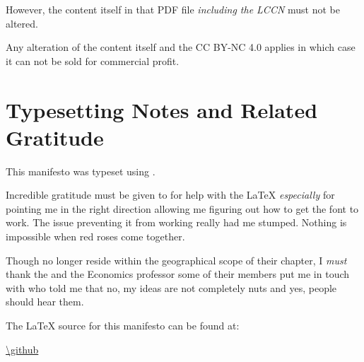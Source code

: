 However, the content itself in that PDF file \emph{including the LCCN} must not be altered.

Any alteration of the content itself and the CC BY-NC 4.0 applies in which case it can not be sold for commercial profit.

\clearpage

\section{Typesetting Notes and Related Gratitude}

This manifesto was typeset using .

\bigskip

\noindent Incredible gratitude must be given to  for help with the \LaTeX{} \emph{especially} for pointing me in the right direction allowing me figuring out how to get the  font to work. The issue preventing it from working really had me stumped. Nothing is impossible when red roses come together.

\bigskip

\noindent Though no longer reside within the geographical scope of their chapter, I \emph{must} thank the  and the Economics professor some of their members put me in touch with who told me that no, my ideas are not completely nuts and yes, people should hear them.

\bigskip

\noindent The \LaTeX{} source for this manifesto can be found at:

\bigskip

\url{\github} 
